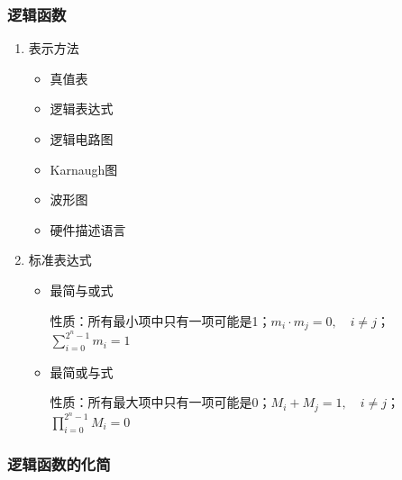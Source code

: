 \documentclass[UTF8,fontset=fandol,zihao=5]{ctexart}
\begin{document}
\subsubsection{逻辑函数}

\begin{enumerate}
  \item 表示方法
  
  \begin{itemize}
    \item 真值表
    \item 逻辑表达式
    \item 逻辑电路图
    \item Karnaugh图
    \item 波形图
    \item 硬件描述语言
  \end{itemize}
  
  \item 标准表达式
  
  \begin{itemize}
    \item 最简与或式
    
    性质：所有最小项中只有一项可能是1；$m_i \cdot m_j = 0,\quad i\ne j$；$\displaystyle \sum_{i=0}^{2^n-1} m_i= 1 $
    
    \item 最简或与式

    性质：所有最大项中只有一项可能是0；$M_i + M_j = 1,\quad i\ne j$；$\displaystyle \prod_{i=0}^{2^n-1} M_i= 0 $

  \end{itemize}

\end{enumerate}

\subsubsection{逻辑函数的化简}
\end{document}
